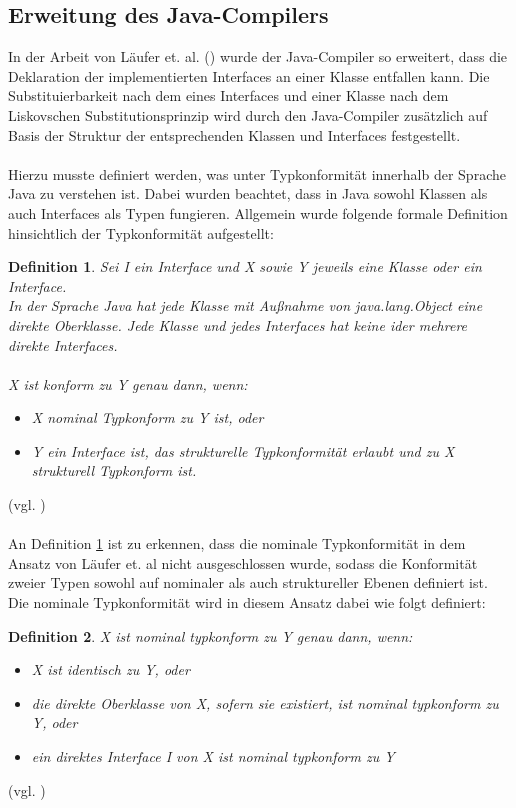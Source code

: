 \documentclass[11pt, 
ngerman,
doublespacing,
chapterinoneline, %
consistentlayout, %
]{scrartcl}
\newtheorem{definition}{Definition}
\begin{document}
\subsection{Erweitung des Java-Compilers}
In der Arbeit von Läufer et. al. (\cite{structconfjava}) wurde der Java-Compiler so erweitert, dass die Deklaration der implementierten Interfaces an einer Klasse entfallen kann. Die Substituierbarkeit nach dem eines Interfaces und einer Klasse nach dem Liskovschen Substitutionsprinzip wird durch den Java-Compiler zusätzlich auf Basis der Struktur der entsprechenden Klassen und Interfaces festgestellt.\\\\
Hierzu musste definiert werden, was unter Typkonformität innerhalb der Sprache Java zu verstehen ist. Dabei wurden beachtet, dass in Java sowohl Klassen als auch Interfaces als Typen fungieren. Allgemein wurde folgende formale Definition hinsichtlich der Typkonformität aufgestellt:
\begin{definition}\label{def_allgTypkonfJava}
Sei \emph{I} ein Interface und \emph{X} sowie \emph{Y} jeweils eine Klasse oder ein Interface.\\
In der Sprache Java hat jede Klasse mit Außnahme von \emph{java.lang.Object} eine direkte Oberklasse. Jede Klasse und jedes Interfaces hat keine ider mehrere direkte Interfaces.\\\\
\emph{X} ist konform zu \emph{Y} genau dann, wenn:
\begin{itemize}
\item\emph{X} nominal Typkonform zu \emph{Y} ist, oder
\item\emph{Y} ein Interface ist, das strukturelle Typkonformität erlaubt und zu \emph{X} strukturell Typkonform ist.
\end{itemize}
\end{definition} (vgl. \cite{structconfjava}) \\\\
An Definition \ref{def_allgTypkonfJava} ist zu erkennen, dass die nominale Typkonformität in dem Ansatz von Läufer et. al \cite{structconfjava} nicht ausgeschlossen wurde, sodass die Konformität zweier Typen sowohl auf nominaler als auch struktureller Ebenen definiert ist. Die nominale Typkonformität wird in diesem Ansatz dabei wie folgt definiert:
\begin{definition}
\emph{X} ist nominal typkonform zu \emph{Y} genau dann, wenn:
\begin{itemize}
\item \emph{X} ist identisch zu \emph{Y}, oder
\item die direkte Oberklasse von \emph{X}, sofern sie existiert, ist nominal typkonform zu \emph{Y}, oder
\item ein direktes Interface \emph{I} von \emph{X} ist nominal typkonform zu \emph{Y}
\end{itemize}
\end{definition} (vgl. \cite{structconfjava})\\\\
\end{document}
